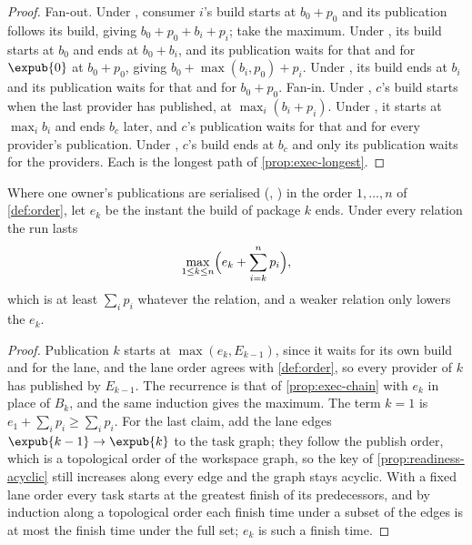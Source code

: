 \begin{proof}
Fan-out. Under , consumer $i$'s build starts at $b_0 + p_0$ and
its publication follows its build, giving $b_0 + p_0 + b_i + p_i$; take the
maximum. Under , its build starts at $b_0$ and ends at $b_0 + b_i$,
and its publication waits for that and for $\expub{0}$ at $b_0 + p_0$, giving
$b_0 + \max(b_i, p_0) + p_i$. Under , its build ends at $b_i$ and its
publication waits for that and for $b_0 + p_0$. Fan-in. Under ,
$c$'s build starts when the last provider has published, at $\max_i (b_i +
p_i)$. Under , it starts at $\max_i b_i$ and ends $b_c$ later, and
$c$'s publication waits for that and for every provider's publication. Under
, $c$'s build ends at $b_c$ and only its publication waits for the
providers. Each is the longest path of \cref{prop:exec-longest}.
\end{proof}

\begin{proposition}
\label{prop:exec-lane}
Where one owner's publications are serialised (, ) in
the order $1, \dots, n$ of \cref{def:order}, let $e_k$ be the instant the build
of package $k$ ends. Under every relation the run lasts
\[
  \max_{1 \le k \le n}\Bigl(e_k + \sum_{i=k}^{n} p_i\Bigr),
\]
which is at least $\sum_{i} p_i$ whatever the relation, and a weaker relation
only lowers the $e_k$.
\end{proposition}

\begin{proof}
Publication $k$ starts at $\max(e_k, E_{k-1})$, since it waits for its own
build and for the lane, and the lane order agrees with \cref{def:order}, so
every provider of $k$ has published by $E_{k-1}$. The recurrence is that of
\cref{prop:exec-chain} with $e_k$ in place of $B_k$, and the same induction
gives the maximum. The term $k = 1$ is $e_1 + \sum_i p_i \ge \sum_i p_i$. For
the last claim, add the lane edges $\expub{k-1} \to \expub{k}$ to the task
graph; they follow the publish order, which is a topological order of the
workspace graph, so the key of \cref{prop:readiness-acyclic} still increases
along every edge and the graph stays acyclic. With a fixed lane order every
task starts at the greatest finish of its predecessors, and by induction along
a topological order each finish time under a subset of the edges is at most
the finish time under the full set; $e_k$ is such a finish time.
\end{proof}

